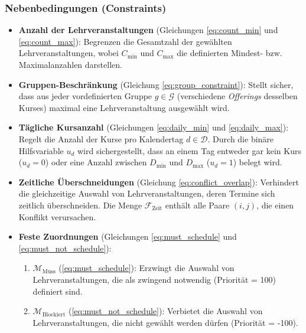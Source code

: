 \newpage


\subsubsection{Nebenbedingungen (Constraints)}\label{chap:ilp_constraints}

\begin{itemize}
    \item \textbf{Anzahl der Lehrveranstaltungen} (Gleichungen \ref{eq:count_min} und \ref{eq:count_max}): Begrenzen die Gesamtzahl der gewählten Lehrveranstaltungen, wobei $C_{\min}$ und $C_{\max}$ die definierten Mindest- bzw. Maximalanzahlen darstellen.

    \item \textbf{Gruppen-Beschränkung} (Gleichung \ref{eq:group_constraint}): Stellt sicher, dass aus jeder vordefinierten Gruppe $g \in \mathcal{G}$ (verschiedene \textit{Offerings} desselben Kurses) maximal eine Lehrveranstaltung ausgewählt wird.

    \item \textbf{Tägliche Kursanzahl} (Gleichungen \ref{eq:daily_min} und \ref{eq:daily_max}): Regelt die Anzahl der Kurse pro Kalendertag $d \in \mathcal{D}$. Durch die binäre Hilfsvariable $u_d$ wird sichergestellt, dass an einem Tag entweder gar kein Kurs ($u_d = 0$) oder eine Anzahl zwischen $D_{\min}$ und $D_{\max}$ ($u_d = 1$) belegt wird.

    \item \textbf{Zeitliche Überschneidungen} (Gleichung \ref{eq:conflict_overlap}): Verhindert die gleichzeitige Auswahl von Lehrveranstaltungen, deren Termine sich zeitlich überschneiden. Die Menge $\mathcal{F}_{\text{Zeit}}$ enthält alle Paare $(i, j)$, die einen Konflikt verursachen.

    \item \textbf{Feste Zuordnungen} (Gleichungen \ref{eq:must_schedule} und \ref{eq:must_not_schedule}):
          \begin{enumerate}
              \item $\mathcal{M}_{\text{Muss}}$ (\ref{eq:must_schedule}): Erzwingt die Auswahl von Lehrveranstaltungen, die als zwingend notwendig (Priorität = 100) definiert sind.
              \item $\mathcal{M}_{\text{Blockiert}}$ (\ref{eq:must_not_schedule}): Verbietet die Auswahl von Lehrveranstaltungen, die nicht gewählt werden dürfen (Priorität = -100).
          \end{enumerate}
\end{itemize}

